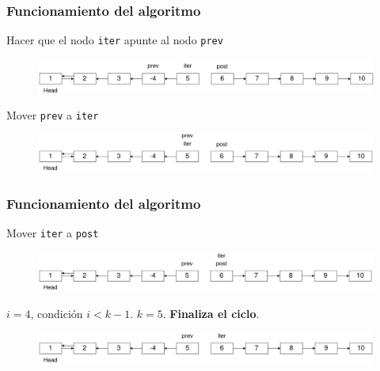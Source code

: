 \documentclass[17pt, t, lualatex]{beamer}
\newcommand{\cppinline}[1]{\lstinline[style=cppstyle]!#1!}
\begin{document}
\begin{frame}
  \frametitle{Funcionamiento del algoritmo}

  Hacer que el nodo \cppinline{iter} apunte al nodo \cppinline{prev}

  \begin{figure}[h]
    \centering
    \includegraphics[width=\textwidth]{img/fig18.png}
  \end{figure}

  Mover \cppinline{prev} a \cppinline{iter}

  \begin{figure}[h]
    \centering
    \includegraphics[width=\textwidth]{img/fig19.png}
  \end{figure}

\end{frame}

\begin{frame}
  \frametitle{Funcionamiento del algoritmo}

  Mover \cppinline{iter} a \cppinline{post}

  \begin{figure}[h]
    \centering
    \includegraphics[width=\textwidth]{img/fig20.png}
  \end{figure}

  $i = 4$, condición $i < k-1$. $k = 5$. \textbf{Finaliza el ciclo}.

  \begin{figure}[h]
    \centering
    \includegraphics[width=\textwidth]{img/fig21.png}
  \end{figure}

\end{frame}
\end{document}
